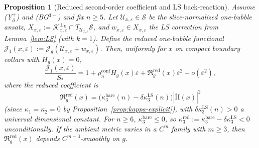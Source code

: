 \documentclass[11pt,reqno,a4paper]{amsart}
\numberwithin{equation}{section}
\theoremstyle{plain}
\newtheorem{proposition}[theorem]{Proposition}
\theoremstyle{remark}
\theoremstyle{plain}
\begin{document}
\begin{proposition}[Reduced second-order coefficient and LS back-reaction]\label{rem:reduced-vs-bare}
Assume \textup{(Y$^+_{\partial}$)} and \textup{(BG$^{3+}$)} and fix $n\ge5$.
Let $\mathcal U_{x,\varepsilon}\in\mathcal S$ be the slice-normalized one-bubble ansatz,
$X_{x,\varepsilon}:=\mathcal K_{x,\varepsilon}^{\perp_E}\cap T_{\mathcal U_{x,\varepsilon}}\mathcal S$,
and $w_{x,\varepsilon}\in X_{x,\varepsilon}$ the LS correction from Lemma~\ref{lem:LS} (with $k=1$).
Define the reduced one-bubble functional
$\mathcal J_1(x,\varepsilon):=\mathcal J_g(\mathcal U_{x,\varepsilon}+w_{x,\varepsilon})$.
Then, uniformly for $x$ on compact boundary collars with $H_g(x)=0$,
\begin{equation}\label{eq:reduced-expansion-clean}
\frac{\mathcal J_1(x,\varepsilon)}{S_\ast}
=1+\rho_n^{\mathrm{conf}}H_g(x)\varepsilon+\mathfrak R_g^{\mathrm{red}}(x)\varepsilon^2+o(\varepsilon^2),
\end{equation}
where the \emph{reduced coefficient} is
\begin{equation}\label{eq:Rg-red-decomp}
\mathfrak R_g^{\mathrm{red}}(x)
=\big(\kappa_3^{\mathrm{bare}}(n)-\delta\kappa_3^{\mathrm{LS}}(n)\big)|\mathring{\mathrm{II}}(x)|^2
\end{equation}
(since $\kappa_1=\kappa_2=0$ by Proposition~\ref{prop:kappa-explicit}),
with $\delta\kappa_3^{\mathrm{LS}}(n)>0$ a universal dimensional constant.
For $n\ge6$, $\kappa_3^{\mathrm{bare}}\le0$, so
$\kappa_3^{\mathrm{red}}:=\kappa_3^{\mathrm{bare}}-\delta\kappa_3^{\mathrm{LS}}<0$
unconditionally.
If the ambient metric varies in a $C^m$ family with $m\ge3$, then
$\mathfrak R_g^{\mathrm{red}}(x)$ depends $C^{m-3}$-smoothly on $g$.
\end{proposition}
\end{document}
